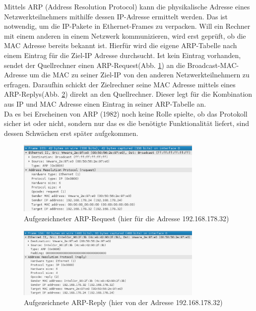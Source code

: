 Mittels ARP (Address Resolution Protocol) kann die physikalische Adresse eines Netzwerkteilnehmers mithilfe dessen IP-Adresse ermittelt werden. Das ist notwendig, um die IP-Pakete in Ethernet-Frames zu verpacken. Will ein Rechner mit einem anderen in einem Netzwerk kommunizieren, wird erst geprüft, ob die MAC Adresse bereits bekannt ist. Hierfür wird die eigene ARP-Tabelle nach einem Eintrag für die Ziel-IP Adresse durchsucht. Ist kein Eintrag vorhanden, sendet der Quellrechner einen ARP-Request(Abb. \ref{fig:arp_request_small}) an die Broadcast-MAC-Adresse um die MAC zu seiner Ziel-IP von den anderen Netzwerkteilnehmern zu erfragen. Daraufhin schickt der Zielrechner seine MAC Adresse mittels eines ARP-Replys(Abb. \ref{fig:arp_reply_small}) direkt an den Quellrechner. Dieser legt für die Kombination aus IP und MAC Adresse einen Eintrag in seiner ARP-Tabelle an. \\
Da es bei Erscheinen von ARP (1982) noch keine Rolle spielte, ob das Protokoll sicher ist oder nicht, sondern nur das es die benötigte Funktionalität liefert, sind dessen Schwächen erst später aufgekommen.\\
\begin{figure}[h!]
	\centering
		\includegraphics[width=0.80\textwidth]{bilder/arpSpoofing/arp_request_small.pdf}
	\caption{Aufgezeichneter ARP-Request (hier für die Adresse 192.168.178.32)}
	\label{fig:arp_request_small}
\end{figure}

\begin{figure}[h!]
	\centering
		\includegraphics[width=0.80\textwidth]{bilder/arpSpoofing/arp_reply_small.pdf}
	\caption{Aufgezeichnete ARP-Reply (hier von der Adresse 192.168.178.32)}
	\label{fig:arp_reply_small}
\end{figure}



